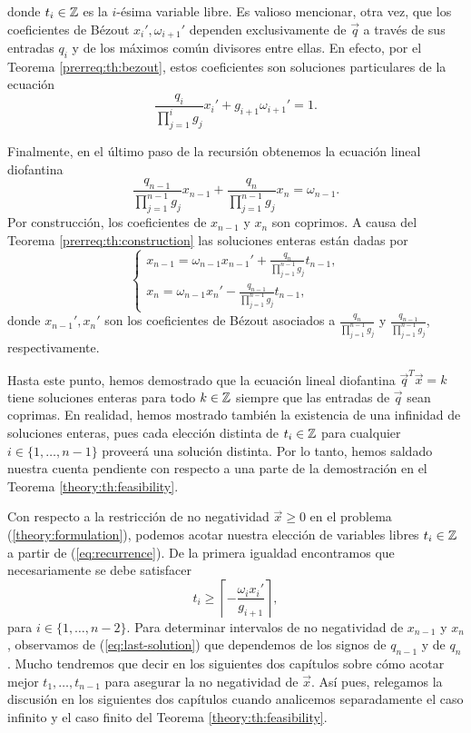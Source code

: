 donde $t_i \in \mathbb{Z}$ es la $i$-ésima variable libre. Es valioso mencionar, otra vez, que los
coeficientes de Bézout $x_i', \omega_{i+1}'$ dependen exclusivamente de $\vec{q}$ a través de sus
entradas $q_i$ y de los máximos común divisores entre ellas. En efecto, por el Teorema
\ref{prerreq:th:bezout}, estos coeficientes son soluciones particulares de la ecuación
\begin{equation}
	\label{dummy:eq:bez-eq}
	\frac{q_i}{\prod_{j=1}^{i}g_j}x_i' + g_{i+1}\omega_{i+1}' = 1.
\end{equation}

Finalmente, en el último paso de la recursión obtenemos la ecuación lineal diofantina
\begin{equation}
	\label{eq:last-equation}
	\frac{q_{n-1}}{\prod_{j=1}^{n-1}g_j}x_{n-1} +
	\frac{q_{n}}{\prod_{j=1}^{n-1}g_j}x_n
	= \omega_{n-1}.
\end{equation}
Por construcción, los coeficientes de $x_{n - 1}$ y $x_n$ son coprimos. A causa del Teorema
\ref{prerreq:th:construction} las soluciones enteras están dadas por
\begin{equation}
	\label{eq:last-solution}
	\begin{cases}
		x_{n-1} = \omega_{n-1}x_{n-1}' + \frac{q_n}{\prod_{j=1}^{n-1}g_j}t_{n-1}, \\
		x_n = \omega_{n-1}x_n' - \frac{q_{n-1}}{\prod_{j=1}^{n-1}g_j}t_{n-1},
	\end{cases}
\end{equation}
donde $x_{n-1}', x_n'$ son los coeficientes de Bézout asociados a
$\frac{q_n}{\prod_{j=1}^{n-1}g_j}$ y $\frac{q_{n-1}}{\prod_{j=1}^{n-1}g_j}$,
respectivamente.

Hasta este punto, hemos demostrado que la ecuación lineal diofantina $\vec{q}^T\vec{x} = k$ tiene
soluciones enteras para todo $k \in \mathbb{Z}$ siempre que las entradas de $\vec{q}$ sean coprimas. En
realidad, hemos mostrado también la existencia de una infinidad de soluciones enteras, pues cada
elección distinta de $t_i \in \mathbb{Z}$ para cualquier $i \in \lbrace 1, \ldots, n - 1\rbrace$ proveerá una
solución distinta. Por lo tanto, hemos saldado nuestra cuenta pendiente con respecto a una parte de
la demostración en el Teorema \ref{theory:th:feasibility}.

Con respecto a la restricción de no negatividad $\vec{x} \geq 0$ en el problema
(\ref{theory:formulation}), podemos acotar nuestra elección de variables libres $t_i \in \mathbb{Z}$ a
partir de (\ref{eq:recurrence}). De la primera igualdad encontramos que necesariamente se debe
satisfacer
\begin{equation}
	\label{eq:param-lb}
	t_i \geq \left\lceil -\frac{\omega_ix_i'}{g_{i + 1}} \right\rceil,
\end{equation}
para $i \in \lbrace 1, \ldots, n - 2\rbrace$. Para determinar intervalos de no negatividad de
$x_{n-1}$ y $x_n$, observamos de (\ref{eq:last-solution}) que dependemos de los signos
de $q_{n-1}$ y de $q_n$. Mucho tendremos que decir en los siguientes dos capítulos sobre
cómo acotar mejor $t_1, \ldots, t_{n-1}$ para asegurar la no negatividad de $\vec{x}$. Así pues,
relegamos la discusión en los siguientes dos capítulos cuando analicemos separadamente el caso
infinito y el caso finito del Teorema \ref{theory:th:feasibility}.


